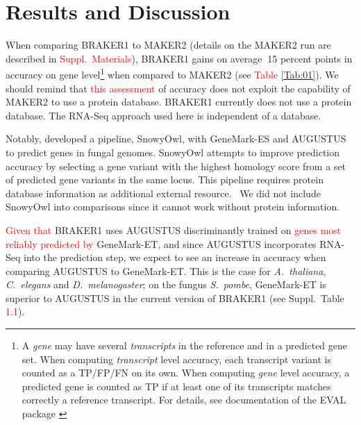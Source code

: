 \documentclass[a4paper,10pt]{article}
\begin{document}
\section{Results and Discussion}

When comparing BRAKER1 to MAKER2 (details on the MAKER2 run are described in \textcolor{red}{Suppl.~Materials}), BRAKER1 gains on average $~$15 percent points in accuracy on gene level\footnote{A \textit{gene} may have several \textit{transcripts} in the reference and in a predicted gene set. When computing \textit{transcript} level accuracy, each transcript variant is counted as a TP/FP/FN on its own. When computing \textit{gene} level accuracy, a predicted gene is counted as TP if at least one of its transcripts matches correctly a reference transcript. For details, see documentation of the EVAL package \citep{Eval}} when compared to MAKER2 (see \textcolor{red}{Table \ref{Tab:01}}).
We should remind that \textcolor{red}{this assessment} of accuracy does not exploit the capability of MAKER2 to use a protein database. BRAKER1 currently does not use a protein database. 
The RNA-Seq approach used here is independent of a database.

Notably, \citet{SnowyOwl} developed a pipeline, SnowyOwl, with GeneMark-ES \citep{GeneMark-ES} and AUGUSTUS to predict genes in fungal genomes. SnowyOwl attempts to improve prediction accuracy by selecting a gene variant with the highest homology score from a set of predicted gene variants in the same locus. This pipeline requires protein database information as additional external resource.  We did not include SnowyOwl into comparisons since it cannot work without protein information.%

\textcolor{red}{Given that} BRAKER1 uses AUGUSTUS discriminantly trained on \textcolor{red}{genes most reliably predicted by} GeneMark-ET, and since AUGUSTUS incorporates RNA-Seq into the prediction step, we expect to see an increase in accuracy when comparing AUGUSTUS to GeneMark-ET. This is the case for \textit{A.~thaliana}, \textit{C.~elegans} and \textit{D.~melanogaster}; on the fungus \textit{S.~pombe}, GeneMark-ET is superior to AUGUSTUS in the current version of BRAKER1 (see Suppl.~Table \textcolor{red}{1.1}). 
\end{document}
